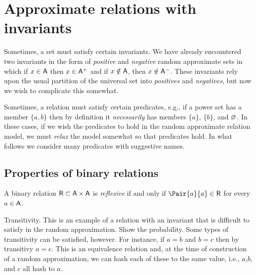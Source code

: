 \documentclass[11pt,final,hidelinks]{article}
\begin{document}
% 
% 
%

\providecommand{\mainx}{..}
\section{Approximate relations with invariants}
Sometimes, a set must satisfy certain invariants.
We have already encountered two invariants in the form of \emph{positive} and \emph{negative} random approximate sets in which if $x \in \Set{A}$ then $x \in \PASet{A}$ and if $x \notin \Set{A}$, then $x \notin \NASet{A}$.
These invariants rely upon the usual partition of the universal set into \emph{positives} and \emph{negatives}, but now we wish to complicate this somewhat.

Sometimes, a relation must satisfy certain predicates, e.g., if a power set has a member $\{a,b\}$ then by definition it \emph{necessarily} has members $\{a\}$, $\{b\}$, and $\varnothing$.
In these cases, if we wish the predicates to hold in the random approximate relation model, we must \emph{relax} the model somewhat so that predicates hold.
In what follows we consider many predicates with suggestive names.

\subsection{Properties of binary relations}
A binary relation $\Relation{R} \subset \Set{A} \times \Set{A}$ is \emph{reflexive} if and only if $\Pair{a}{a} \in \Relation{R}$ for every $a \in \Set{A}$.



Transitivity. This is an example of a relation with an invariant that is difficult to satisfy in the random approximation. Show the probability.
Some types of transitivity can be satisfied, however. For instance, if $a=b$ and $b=c$ then by transitivy $a=c$. This is an equivalence relation and, at the time of construction of a random approximation, we can hash each of these to the same value, i.e., $a$,$b$, and $c$ all hash to $a$.
\end{document}
